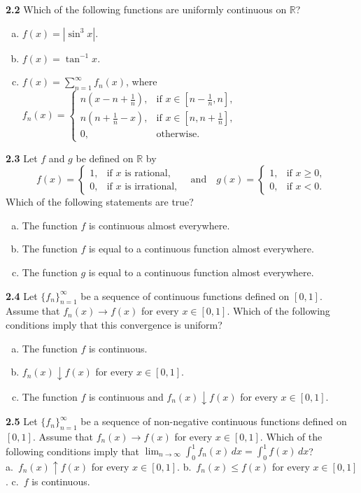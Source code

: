 \documentclass[11pt,a4paper]{article}
\newcommand{\R}{\mathbb{R}}
\newcommand{\qitem}[1]{\par\medskip\noindent\textbf{#1}\hspace{0.5em}}
\begin{document}
\qitem{2.2} Which of the following functions are uniformly continuous on $\R$?
\begin{enumerate}[a.]
  \item $f(x) = |\sin^3 x|$.
  \item $f(x) = \tan^{-1} x$.
  \item $f(x) = \sum_{n=1}^{\infty} f_n(x)$, where $f_n(x) = \begin{cases} n(x - n + \frac{1}{n}), & \text{if } x \in [n - \frac{1}{n}, n], \\ n(n + \frac{1}{n} - x), & \text{if } x \in [n, n + \frac{1}{n}], \\ 0, & \text{otherwise.} \end{cases}$
\end{enumerate}

\qitem{2.3} Let $f$ and $g$ be defined on $\R$ by
\[
  f(x) = \begin{cases} 1, & \text{if } x \text{ is rational,} \\ 0, & \text{if } x \text{ is irrational,} \end{cases}
  \quad\text{and}\quad
  g(x) = \begin{cases} 1, & \text{if } x \ge 0, \\ 0, & \text{if } x < 0. \end{cases}
\]
Which of the following statements are true?
\begin{enumerate}[a.]
  \item The function $f$ is continuous almost everywhere.
  \item The function $f$ is equal to a continuous function almost everywhere.
  \item The function $g$ is equal to a continuous function almost everywhere.
\end{enumerate}

\qitem{2.4} Let $\{f_n\}_{n=1}^{\infty}$ be a sequence of continuous functions defined on $[0, 1]$. Assume that $f_n(x) \to f(x)$ for every $x \in [0, 1]$. Which of the following conditions imply that this convergence is uniform?
\begin{enumerate}[a.]
  \item The function $f$ is continuous.
  \item $f_n(x) \downarrow f(x)$ for every $x \in [0, 1]$.
  \item The function $f$ is continuous and $f_n(x) \downarrow f(x)$ for every $x \in [0, 1]$.
\end{enumerate}

\qitem{2.5} Let $\{f_n\}_{n=1}^{\infty}$ be a sequence of non-negative continuous functions defined on $[0, 1]$. Assume that $f_n(x) \to f(x)$ for every $x \in [0, 1]$. Which of the following conditions imply that $\lim_{n \to \infty} \int_0^1 f_n(x)\,dx = \int_0^1 f(x)\,dx$?\\
a.\ $f_n(x) \uparrow f(x)$ for every $x \in [0, 1]$. \qquad b.\ $f_n(x) \le f(x)$ for every $x \in [0, 1]$. \qquad c.\ $f$ is continuous.
\end{document}

